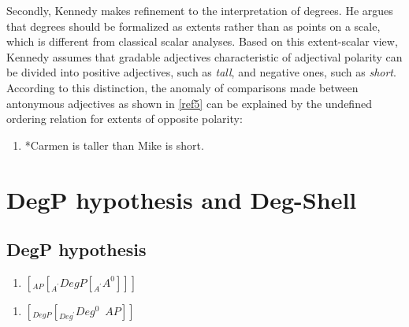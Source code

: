 \documentclass{ctexart}
\let \cite \parencite
\begin{document}
Secondly, Kennedy makes refinement to the interpretation of degrees. He argues that degrees should be formalized as extents\cite{seuren1978,von1984b,bierwisch1989,lobner2010} rather than as points on a scale, which is different from classical scalar analyses. Based on this extent-scalar view, Kennedy assumes that gradable adjectives characteristic of adjectival polarity can be divided into positive adjectives, such as \textit{tall}, and negative ones, such as \textit{short}. According to this distinction, the anomaly of comparisons made between antonymous adjectives as shown in \ref{ref5} can be explained by the undefined ordering relation for extents of opposite polarity:

\begin{enumerate}[resume]
\item \label{ref5}
*Carmen is taller than Mike is short.
\end{enumerate}



\section{DegP hypothesis and Deg-Shell}

\subsection{DegP hypothesis}


\begin{enumerate}[resume]
\item
$[_{AP} [_{A^{\prime}} DegP[_{A^{\prime}} A^0]]]$
\end{enumerate}

\begin{enumerate}[resume]
\item
$[_{DegP} [_{Deg^{\prime}} Deg^0 \enspace AP]]$
\end{enumerate}

\end{document}
